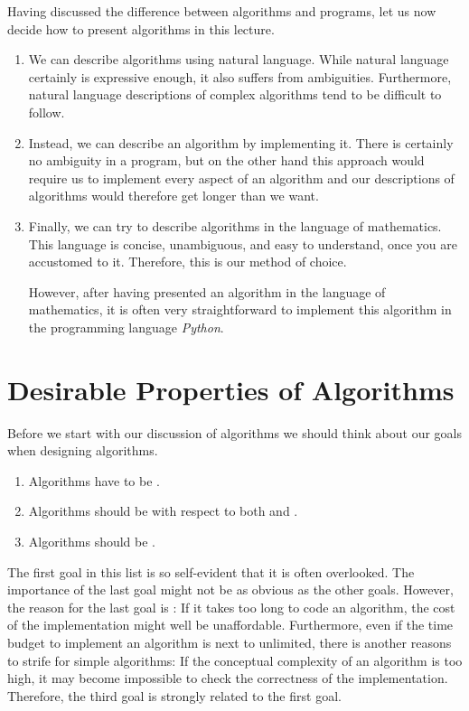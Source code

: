 Having discussed the difference between algorithms and programs, let us now decide how to present
algorithms in this lecture.  
\begin{enumerate}
\item We can describe algorithms using natural language.  While natural language certainly is
      expressive enough, it also suffers from ambiguities.  Furthermore, natural language
      descriptions of complex algorithms tend to be difficult to follow.
\item Instead, we can describe an algorithm by implementing it.  There is certainly no ambiguity
      in a program, but on the other hand this approach would require us to implement every aspect
      of an  algorithm and our descriptions of algorithms would therefore get longer than we want.
\item Finally, we can try to describe algorithms in the language of mathematics.  This language is 
      concise, unambiguous, and easy to understand, once you are accustomed to it.  Therefore, this is
      our method of choice.

      However, after having presented an algorithm in the language of mathematics, it is often very
      straightforward  to implement this algorithm in the programming language
      \textsl{Python}.
\end{enumerate}

\section{Desirable Properties of Algorithms}
Before we start with our discussion of algorithms we should think about our goals when designing
algorithms.  
\begin{enumerate}
\item Algorithms have to be .
\item Algorithms should be  with respect to both  and .
\item Algorithms should be .
\end{enumerate}
The first goal in this list is so self-evident that it is often overlooked.  The
importance of the last goal might not be as obvious as the other goals.
However, the reason for the last goal is :  If it takes too long to code an algorithm, the
cost of the implementation might well be unaffordable.  Furthermore, even if the time budget to implement an
algorithm is next to unlimited,  there is another reasons to strife for simple algorithms:  If the conceptual
complexity of an algorithm is too high, it may become impossible to check the correctness of the
implementation.  Therefore, the third goal is strongly related to the first goal.  

